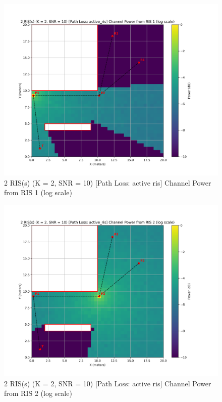 \begin{figure}[H]
  \centering
  \includegraphics[width=0.8\linewidth]{imgs/heatmap-simulations/2 RIS(s) (K = 2, SNR = 10) [Path Loss_ active_ris] Channel Power from RIS 1 (log scale).png}
  \caption{2 RIS(s) (K = 2, SNR = 10) [Path Loss: active ris] Channel Power from RIS 1 (log scale)}
\end{figure}

\begin{figure}[H]
  \centering
  \includegraphics[width=0.8\linewidth]{imgs/heatmap-simulations/2 RIS(s) (K = 2, SNR = 10) [Path Loss_ active_ris] Channel Power from RIS 2 (log scale).png}
  \caption{2 RIS(s) (K = 2, SNR = 10) [Path Loss: active ris] Channel Power from RIS 2 (log scale)}
\end{figure}

